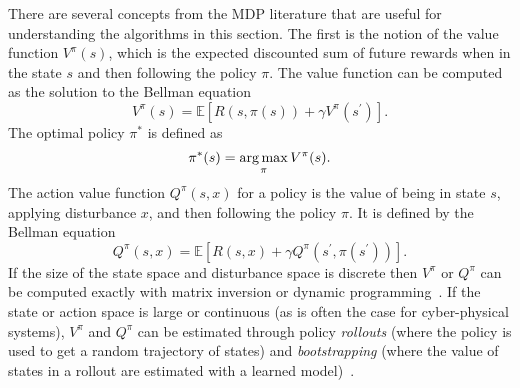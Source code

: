 There are several concepts from the MDP literature that are useful for understanding the algorithms in this section. The first is the notion of the value function $V^\pi(s)$, which is the expected discounted sum of future rewards when in the state $s$ and then following the policy $\pi$. The value function can be computed as the solution to the Bellman equation
\begin{equation}
    V^\pi(s) = \mathbb{E}\left[ R\left(s, \pi(s)\right) + \gamma V^\pi(s^\prime) \right] \text{.}
\end{equation}
The optimal policy $\pi^*$ is defined as 
\begin{equation}
    \pi^*(s) = \argmax_{\pi} V^\pi(s) \text{.}
\end{equation}
The action value function $Q^\pi(s, x)$ for a policy is the value of being in state $s$, applying disturbance $x$, and then following the policy $\pi$. It is defined by the Bellman equation
\begin{equation}
    Q^\pi(s,x) = \mathbb{E}\left[ R(s, x) + \gamma Q^\pi\left(s^\prime, \pi(s^\prime)\right) \right]\text{.}
\end{equation}
If the size of the state space and disturbance space is discrete then $V^\pi$ or $Q^\pi$ can be computed exactly with matrix inversion or dynamic programming~\cite{dmubook}. If the state or action space is large or continuous (as is often the case for cyber-physical systems), $V^\pi$ and $Q^\pi$ can be estimated through policy \emph{rollouts} (where the policy is used to get a random trajectory of states) and \emph{bootstrapping} (where the value of states in a rollout are estimated with a learned model)~\cite{sutton2018reinforcement}. 

